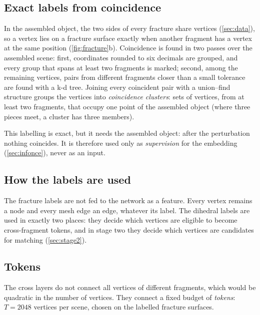 \documentclass[11pt,a4paper]{article}
\theoremstyle{remark}
\begin{document}
\subsection{Exact labels from coincidence}
\label{sec:coincidence}
In the assembled object, the two sides of every fracture share vertices (\cref{sec:data}), so a vertex lies on a fracture surface exactly when another fragment has a vertex at the same position (\cref{fig:fracture}b). Coincidence is found in two passes over the assembled scene: first, coordinates rounded to six decimals are grouped, and every group that spans at least two fragments is marked; second, among the remaining vertices, pairs from different fragments closer than a small tolerance are found with a k-d tree. Joining every coincident pair with a union--find structure groups the vertices into \emph{coincidence clusters}: sets of vertices, from at least two fragments, that occupy one point of the assembled object (where three pieces meet, a cluster has three members).

This labelling is exact, but it needs the assembled object: after the perturbation nothing coincides. It is therefore used only as \emph{supervision} for the embedding (\cref{sec:infonce}), never as an input.

\subsection{How the labels are used}
The fracture labels are not fed to the network as a feature. Every vertex remains a node and every mesh edge an edge, whatever its label. The dihedral labels are used in exactly two places: they decide which vertices are eligible to become cross-fragment tokens, and in stage two they decide which vertices are candidates for matching (\cref{sec:stage2}).

\subsection{Tokens}
\label{sec:tokens}
The cross layers do not connect all vertices of different fragments, which would be quadratic in the number of vertices. They connect a fixed budget of \emph{tokens}: $T=2048$ vertices per scene, chosen on the labelled fracture surfaces.
\end{document}
